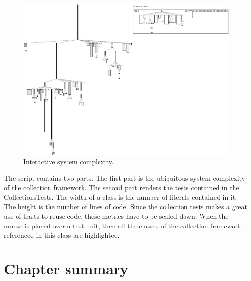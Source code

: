 \documentclass[a4paper,10pt,twoside]{book}
\begin{document}
\begin{figure}[htbp]
\centerline{\includegraphics[width=\linewidth]{testCoverage.png}}
\caption{Interactive system complexity.}
\label{fig:interactiveTestCoverage}
\end{figure}


The script contains two parts. The first part is the ubiquitous system complexity of the collection framework.  The second part renders the tests contained in the CollectionsTests. The width of a class is the number of literals contained in it. The height is the number of lines of code. Since the collection tests makes a great use of traits to reuse code, these metrics have to be scaled down. When the mouse is placed over a test unit, then all the classes of the collection framework referenced in this class are highlighted. 


\section{Chapter summary}
\end{document}
